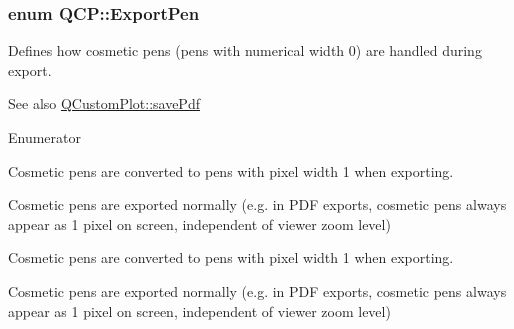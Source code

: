 \subsubsection[{\texorpdfstring{Export\+Pen}{ExportPen}}]{\setlength{\rightskip}{0pt plus 5cm}enum {\bf Q\+C\+P\+::\+Export\+Pen}}\hypertarget{namespace_q_c_p_a17844f19e1019693a953e1eb93536d2f}{}\label{namespace_q_c_p_a17844f19e1019693a953e1eb93536d2f}
Defines how cosmetic pens (pens with numerical width 0) are handled during export.

\begin{DoxySeeAlso}{See also}
\hyperlink{class_q_custom_plot_ad5acd34f6b39c3516887d7e54fec2412}{Q\+Custom\+Plot\+::save\+Pdf} 
\end{DoxySeeAlso}
\begin{Desc}
\item[Enumerator]\par
\begin{description}
\item[{\em 
ep\+No\+Cosmetic\hypertarget{namespace_q_c_p_a17844f19e1019693a953e1eb93536d2faec51f17ee42178094138e69ac73daa52}{}\label{namespace_q_c_p_a17844f19e1019693a953e1eb93536d2faec51f17ee42178094138e69ac73daa52}
}]Cosmetic pens are converted to pens with pixel width 1 when exporting. \item[{\em 
ep\+Allow\+Cosmetic\hypertarget{namespace_q_c_p_a17844f19e1019693a953e1eb93536d2fa34716c7388ad3a2ff3ac27e57fb83a5b}{}\label{namespace_q_c_p_a17844f19e1019693a953e1eb93536d2fa34716c7388ad3a2ff3ac27e57fb83a5b}
}]Cosmetic pens are exported normally (e.\+g. in P\+DF exports, cosmetic pens always appear as 1 pixel on screen, independent of viewer zoom level) \item[{\em 
ep\+No\+Cosmetic\hypertarget{namespace_q_c_p_a17844f19e1019693a953e1eb93536d2faec51f17ee42178094138e69ac73daa52}{}\label{namespace_q_c_p_a17844f19e1019693a953e1eb93536d2faec51f17ee42178094138e69ac73daa52}
}]Cosmetic pens are converted to pens with pixel width 1 when exporting. \item[{\em 
ep\+Allow\+Cosmetic\hypertarget{namespace_q_c_p_a17844f19e1019693a953e1eb93536d2fa34716c7388ad3a2ff3ac27e57fb83a5b}{}\label{namespace_q_c_p_a17844f19e1019693a953e1eb93536d2fa34716c7388ad3a2ff3ac27e57fb83a5b}
}]Cosmetic pens are exported normally (e.\+g. in P\+DF exports, cosmetic pens always appear as 1 pixel on screen, independent of viewer zoom level) \end{description}
\end{Desc}
